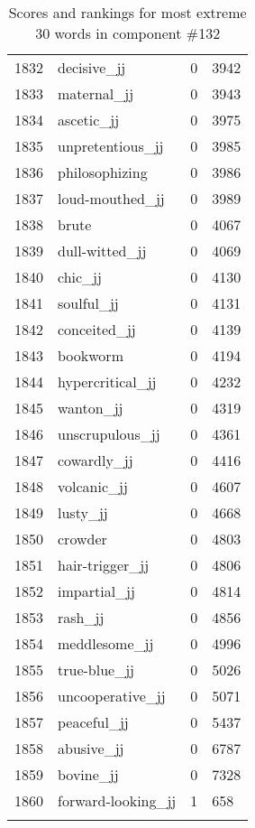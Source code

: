 \begin{longtable}[!htbp]{| rlr@{.}l |}
    1832 & decisive\_jj & 0 & 3942 \\
    1833 & maternal\_jj & 0 & 3943 \\
    1834 & ascetic\_jj & 0 & 3975 \\
    1835 & unpretentious\_jj & 0 & 3985 \\
    1836 & philosophizing & 0 & 3986 \\
    1837 & loud-mouthed\_jj & 0 & 3989 \\
    1838 & brute & 0 & 4067 \\
    1839 & dull-witted\_jj & 0 & 4069 \\
    1840 & chic\_jj & 0 & 4130 \\
    1841 & soulful\_jj & 0 & 4131 \\
    1842 & conceited\_jj & 0 & 4139 \\
    1843 & bookworm & 0 & 4194 \\
    1844 & hypercritical\_jj & 0 & 4232 \\
    1845 & wanton\_jj & 0 & 4319 \\
    1846 & unscrupulous\_jj & 0 & 4361 \\
    1847 & cowardly\_jj & 0 & 4416 \\
    1848 & volcanic\_jj & 0 & 4607 \\
    1849 & lusty\_jj & 0 & 4668 \\
    1850 & crowder & 0 & 4803 \\
    1851 & hair-trigger\_jj & 0 & 4806 \\
    1852 & impartial\_jj & 0 & 4814 \\
    1853 & rash\_jj & 0 & 4856 \\
    1854 & meddlesome\_jj & 0 & 4996 \\
    1855 & true-blue\_jj & 0 & 5026 \\
    1856 & uncooperative\_jj & 0 & 5071 \\
    1857 & peaceful\_jj & 0 & 5437 \\
    1858 & abusive\_jj & 0 & 6787 \\
    1859 & bovine\_jj & 0 & 7328 \\
    1860 & forward-looking\_jj & 1 & 658 \\
    \hline
    \caption{Scores and rankings for most extreme 30 words in component \#132} \\
\end{longtable}
